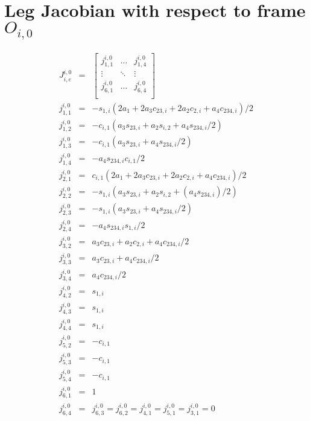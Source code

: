 \chapter{Leg Jacobian with respect to frame $O_{i,0}$}
\label{appendix::a}
	\vspace{-5mm}
	\begin{eqnarray*}
		J^{i,0}_{i,e} &=& 
		\left[
			\begin{array}{ccc}
				j_{1,1}^{i,0}	& \ldots 		& j_{1,4}^{i,0} 	\\
				\vdots 			& \ddots 		& \vdots 			\\
				j_{6,1}^{i,0}	& \ldots 	 	& j_{6,4}^{i,0} 	\\
			\end{array}
		\right]\\
		j_{1,1}^{i,0} &=& -s_{1,i} (2 a_{1} + 2 a_{3} c_{23,i} + 2 a_{2} c_{2,i} + a_{4} c_{234,i})/2\nonumber\\
		j_{1,2}^{i,0} &=& -c_{i,1} (a_{3} s_{23,i} + a_{2} s_{i,2} + a_{4} s_{234,i}/2)				\nonumber\\
		j_{1,3}^{i,0} &=& -c_{i,1} (a_{3} s_{23,i} + a_{4} s_{234,i}/2)								\nonumber\\
		j_{1,4}^{i,0} &=& -a_{4} s_{234,i} c_{i,1}/2 												\nonumber\\
		j_{2,1}^{i,0} &=& c_{i,1} (2 a_{1} + 2 a_{3} c_{23,i} + 2 a_{2} c_{2,i} + a_{4} c_{234,i})/2\nonumber\\
		j_{2,2}^{i,0} &=& -s_{1,i} (a_{3} s_{23,i} + a_{2} s_{i,2} + (a_{4} s_{234,i})/2)				\nonumber\\
		j_{2,3}^{i,0} &=& -s_{1,i} (a_{3} s_{23,i} + a_{4} s_{234,i}/2)								\nonumber\\
		j_{2,4}^{i,0} &=& -a_{4} s_{234,i} s_{1,i}/2 												\nonumber\\
		j_{3,2}^{i,0} &=& a_{3} c_{23,i} + a_{2} c_{2,i} + a_{4} c_{234,i}/2						\nonumber\\
		j_{3,3}^{i,0} &=& a_{3} c_{23,i} + a_{4} c_{234,i}/2										\nonumber\\
		j_{3,4}^{i,0} &=& a_{4} c_{234,i}/2 														\nonumber\\
		j_{4,2}^{i,0} &=& s_{1,i}																		\nonumber\\
		j_{4,3}^{i,0} &=& s_{1,i}																		\nonumber\\
		j_{4,4}^{i,0} &=& s_{1,i}																		\nonumber\\
		j_{5,2}^{i,0} &=& -c_{i,1}																	\nonumber\\
		j_{5,3}^{i,0} &=& -c_{i,1}																	\nonumber\\
		j_{5,4}^{i,0} &=& -c_{i,1}																	\nonumber\\
		j_{6,1}^{i,0} &=& 1																			\nonumber\\
		j_{6,4}^{i,0} &=& j_{6,3}^{i,0} = j_{6,2}^{i,0} = j_{4,1}^{i,0} = j_{5,1}^{i,0} = j_{3,1}^{i,0} = 0															\nonumber\\
		\label{eq::leg_jacobian}
	\end{eqnarray*}